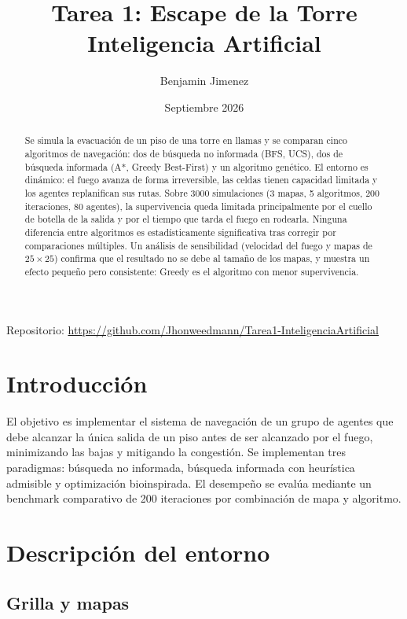 \documentclass[11pt,a4paper]{article}
\title{Tarea 1: Escape de la Torre\\[4pt]\large Inteligencia Artificial}
\author{Benjamin Jimenez}
\date{Septiembre 2026}
\begin{document}
\maketitle

\begin{center}
\small Repositorio: \url{https://github.com/Jhonweedmann/Tarea1-InteligenciaArtificial}
\end{center}

\begin{abstract}
Se simula la evacuación de un piso de una torre en llamas y se comparan cinco algoritmos de navegación: dos de búsqueda no informada (BFS, UCS), dos de búsqueda informada (A*, Greedy Best-First) y un algoritmo genético. El entorno es dinámico: el fuego avanza de forma irreversible, las celdas tienen capacidad limitada y los agentes replanifican sus rutas. Sobre 3000 simulaciones (3 mapas, 5 algoritmos, 200 iteraciones, 80 agentes), la supervivencia queda limitada principalmente por el cuello de botella de la salida y por el tiempo que tarda el fuego en rodearla. Ninguna diferencia entre algoritmos es estadísticamente significativa tras corregir por comparaciones múltiples. Un análisis de sensibilidad (velocidad del fuego y mapas de $25\times25$) confirma que el resultado no se debe al tamaño de los mapas, y muestra un efecto pequeño pero consistente: Greedy es el algoritmo con menor supervivencia.
\end{abstract}

\section{Introducción}

El objetivo es implementar el sistema de navegación de un grupo de agentes que debe alcanzar la única salida de un piso antes de ser alcanzado por el fuego, minimizando las bajas y mitigando la congestión. Se implementan tres paradigmas: búsqueda no informada, búsqueda informada con heurística admisible y optimización bioinspirada. El desempeño se evalúa mediante un benchmark comparativo de 200 iteraciones por combinación de mapa y algoritmo.

\section{Descripción del entorno}

\subsection{Grilla y mapas}
\end{document}
